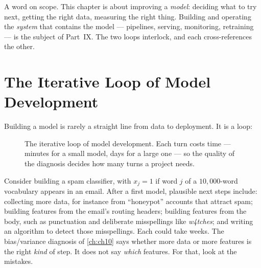 A word on scope. This chapter is about improving a \emph{model}: deciding what to
try next, getting the right data, measuring the right thing. Building and
operating the \emph{system} that contains the model --- pipelines, serving,
monitoring, retraining --- is the subject of Part~IX. The two loops interlock,
and each cross-references the other.

\section{The Iterative Loop of Model Development}
\label{sec:loop}

Building a model is rarely a straight line from data to deployment. It is a loop:

\begin{figure}[htbp]
  \centering
  \caption{The iterative loop of model development. Each turn costs time ---
  minutes for a small model, days for a large one --- so the quality of the
  diagnosis decides how many turns a project needs.}
  \label{fig:dev-loop}
\end{figure}

Consider building a spam classifier, with $x_j = 1$ if word $j$ of a
$10{,}000$-word vocabulary appears in an email. After a first model, plausible
next steps include: collecting more data, for instance from ``honeypot''
accounts that attract spam; building features from the email's routing headers;
building features from the body, such as punctuation and deliberate misspellings
like \emph{w4tches}; and writing an algorithm to detect those misspellings. Each
could take weeks. The bias/variance diagnosis of \cref{ch:ch10} says whether
more data or more features is the right \emph{kind} of step. It does not say
\emph{which} features. For that, look at the mistakes.

